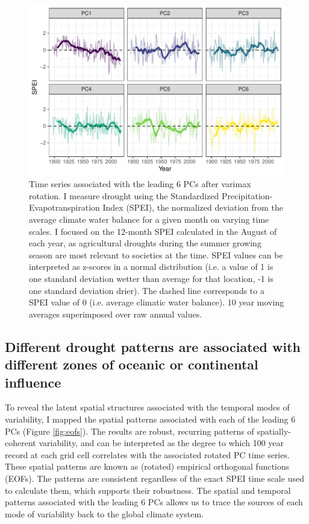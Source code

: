 \documentclass[10pt]{iopart}
\begin{document}
\begin{figure}[!ht]
\centering
\includegraphics[width=\linewidth]{figures/pc_obs.pdf}
\caption{Time series associated with the leading 6 PCs after varimax rotation. I measure drought using the Standardized Precipitation-Evapotranspiration Index (SPEI), the normalized deviation from the average climate water balance for a given month on varying time scales. I focused on the 12-month SPEI calculated in the August of each year, as agricultural droughts during the summer growing season are most relevant to societies at the time. SPEI values can be interpreted as z-scores in a normal distribution (i.e. a value of 1 is one standard deviation wetter than average for that location, -1 is one standard deviation drier). The dashed line corresponds to a SPEI value of 0 (i.e. average climatic water balance). 10 year moving averages superimposed over raw annual values.}
\label{fig:pc-obs}
\end{figure}

\subsection*{Different drought patterns are associated with different zones of oceanic or continental influence}

To reveal the latent spatial structures associated with the temporal modes of variability, I mapped the spatial patterns associated with each of the leading 6 PCs (Figure \ref{fig:eofs}). The results are robust, recurring patterns of spatially-coherent variability, and can be interpreted as the degree to which 100 year record at each grid cell correlates with the associated rotated PC time series. These spatial patterns are known as (rotated) empirical orthogonal functions (EOFs). The patterns are consistent regardless of the exact SPEI time scale used to calculate them, which supports their robustness. The spatial and temporal patterns associated with the leading 6 PCs allows us to trace the sources of each mode of variability back to the global climate system.
\end{document}
